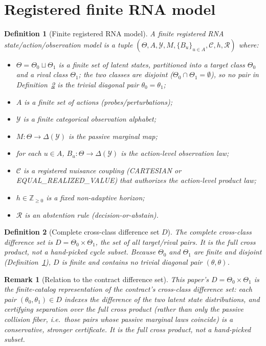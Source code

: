 \documentclass[11pt]{article}
\newtheorem{definition}{Definition}
\newtheorem{remark}{Remark}
\begin{document}
\section{Registered finite RNA model}\label{sec:model}
\begin{definition}[Finite registered RNA model]\label{def:model}
A \emph{finite registered RNA state/action/observation model} is a tuple
$(\Theta,A,\mathcal{Y},M,\{B_u\}_{u\in A},\mathcal{C},h,\mathcal{R})$ where:
\begin{itemize}[nosep]
  \item $\Theta=\Theta_0\sqcup\Theta_1$ is a finite set of latent states, partitioned into a
        \emph{target} class $\Theta_0$ and a \emph{rival} class $\Theta_1$; the two classes are
        \emph{disjoint} ($\Theta_0\cap\Theta_1=\emptyset$), so no pair in
        Definition~\ref{def:D} is the trivial diagonal pair $\theta_0=\theta_1$;
  \item $A$ is a finite set of \emph{actions} (probes/perturbations);
  \item $\mathcal{Y}$ is a finite categorical \emph{observation alphabet};
  \item $M:\Theta\to\Delta(\mathcal{Y})$ is the \emph{passive marginal map};
  \item for each $u\in A$, $B_u:\Theta\to\Delta(\mathcal{Y})$ is the \emph{action-level observation law};
  \item $\mathcal{C}$ is a registered \emph{nuisance coupling} (CARTESIAN or
        EQUAL\_REALIZED\_VALUE) that authorizes the action-level product law;
  \item $h\in\mathbb{Z}_{\ge 0}$ is a fixed \emph{non-adaptive horizon};
  \item $\mathcal{R}$ is an \emph{abstention rule} (decision-or-abstain).
\end{itemize}
\end{definition}

\begin{definition}[Complete cross-class difference set $D$]\label{def:D}
The \emph{complete cross-class difference set} is
$D=\Theta_0\times\Theta_1$, the set of all target/rival pairs. It is the full cross product, not a
hand-picked cycle subset. Because $\Theta_0$ and $\Theta_1$ are finite and disjoint
(Definition~\ref{def:model}), $D$ is finite and contains no trivial diagonal pair $(\theta,\theta)$.
\end{definition}

\begin{remark}[Relation to the contract difference set]\label{rem:D-relation}
This paper's $D=\Theta_0\times\Theta_1$ is the finite-catalog representation of the contract's
cross-class difference set: each pair $(\theta_0,\theta_1)\in D$ indexes the difference of the two
latent state distributions, and certifying separation over the \emph{full} cross product (rather than
only the passive collision fiber, i.e.\ those pairs whose passive marginal laws coincide) is
a conservative, stronger certificate. It is the full cross product, not a hand-picked subset.
\end{remark}
\end{document}
